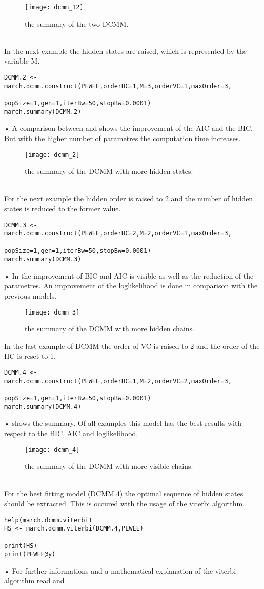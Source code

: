 \begin{figure}[h]
    \centering
    \texttt{[image: dcmm\_12]}
    \caption{the summary of the two DCMM.}
    \label{fig:dcmm_12}
\end{figure}\\
In the next example the hidden states are raised, which is represented by the variable M.
\begin{verbatim}
DCMM.2 <- march.dcmm.construct(PEWEE,orderHC=1,M=3,orderVC=1,maxOrder=3,
                               popSize=1,gen=1,iterBw=50,stopBw=0.0001)
march.summary(DCMM.2)
\end{verbatim}•
A comparison between  and  shows the improvement of the AIC and the BIC. But with the higher number of parametres the computation time increases.
\begin{figure}[h]
    \centering
    \texttt{[image: dcmm\_2]}
    \caption{the summary of the DCMM with more hidden states.}
    \label{fig:dcmm_2}
\end{figure}\\
For the next example the hidden order is raised to 2 and the number of hidden states is reduced to the former value. 
\begin{verbatim}
DCMM.3 <- march.dcmm.construct(PEWEE,orderHC=2,M=2,orderVC=1,maxOrder=3,
                               popSize=1,gen=1,iterBw=50,stopBw=0.0001)
march.summary(DCMM.3)
\end{verbatim}•
In  the improvement of BIC and AIC is visible as well as the reduction of the parametres. An improvement of the loglikelihood is done in comparison with the previous models.
\begin{figure}[h]
    \centering
    \texttt{[image: dcmm\_3]}
    \caption{the summary of the DCMM with more hidden chains.}
    \label{fig:dcmm_3}
\end{figure}\newline
In the last example of DCMM the order of VC is raised to 2 and the order of the HC is reset to 1.
\begin{verbatim}
DCMM.4 <- march.dcmm.construct(PEWEE,orderHC=1,M=2,orderVC=2,maxOrder=3,
                               popSize=1,gen=1,iterBw=50,stopBw=0.0001)
march.summary(DCMM.4)
\end{verbatim}•
 shows the summary. Of all examples this model has the best results with respect to the BIC, AIC and loglikelihood. 
\begin{figure}[h]
    \centering
    \texttt{[image: dcmm\_4]}
    \caption{the summary of the DCMM with more visible chains.}
    \label{fig:dcmm_4}
\end{figure}\\
For the best fitting model (DCMM.4) the optimal sequence of hidden states should be extracted. This is occured with the usage of the viterbi algorithm. 
\begin{verbatim}
help(march.dcmm.viterbi)
HS <- march.dcmm.viterbi(DCMM.4,PEWEE)

print(HS)
print(PEWEE@y)
\end{verbatim}•
For further informations and a mathematical explanation of the viterbi algorithm read \cite{Forney1973} and \cite{Berchtold2002}

